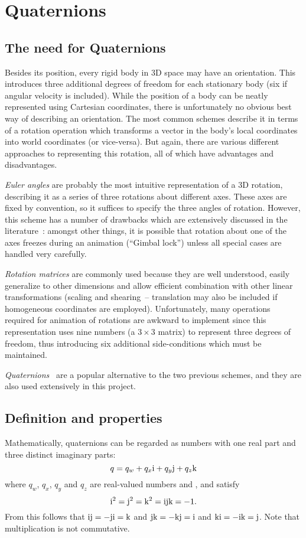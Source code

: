 \section{Quaternions\label{quaternions}}
\subsection{The need for Quaternions}
Besides its position, every rigid body in 3D space may have an orientation. This introduces three
additional degrees of freedom for each stationary body (six if angular velocity is included).
While the position of a body can be neatly represented using Cartesian coordinates, there is
unfortunately no obvious best way of describing an orientation. The most common schemes describe
it in terms of a rotation operation which transforms a vector in the body's local
coordinates into world coordinates (or vice-versa). But again, there are various different
approaches to representing this rotation, all of which have advantages and disadvantages.

\emph{Euler angles} are probably the most intuitive representation of a 3D rotation, describing
it as a series of three rotations about different axes. These axes are fixed by convention, so it
suffices to specify the three angles of rotation. However, this scheme has a number of drawbacks
which are extensively discussed in the literature~\cite{Saunders:PhD,Shoemake:85}: amongst other
things, it is possible that rotation about one of the axes freezes during an animation
(``Gimbal lock'') unless all special cases are handled very carefully.

\emph{Rotation matrices} are commonly used because they are well understood, easily generalize
to other dimensions and allow efficient combination with other linear transformations (scaling
and shearing~-- translation may also be included if homogeneous coordinates are employed).
Unfortunately, many operations required for animation of rotations are awkward to implement
since this representation uses nine numbers (a $3\times3$ matrix) to represent three degrees
of freedom, thus introducing six additional side-conditions which must be maintained.

\emph{Quaternions}~\cite{Shoemake:85,Eberly:01,MathWorld:Quaternion} are a popular alternative
to the two previous schemes, and they are also used extensively in this project.

\subsection{Definition and properties}
Mathematically, quaternions can be regarded as numbers with one real part and three
distinct imaginary parts:
\begin{equation}
q = q_w + q_x\mathrm{i} + q_y\mathrm{j} + q_z\mathrm{k}
\end{equation}
where $q_w$, $q_x$, $q_y$ and $q_z$ are real-valued numbers and \qi{}, \qj{} and \qk{} satisfy
\begin{equation}
\mathrm{i}^2 = \mathrm{j}^2 = \mathrm{k}^2 = \mathrm{i}\mathrm{j}\mathrm{k} = -1.
\end{equation}
From this follows that
$\mathrm{i}\mathrm{j} = -\mathrm{j}\mathrm{i} = \mathrm{k}$ and
$\mathrm{j}\mathrm{k} = -\mathrm{k}\mathrm{j} = \mathrm{i}$ and
$\mathrm{k}\mathrm{i} = -\mathrm{i}\mathrm{k} = \mathrm{j}$.
Note that multiplication is not commutative.

